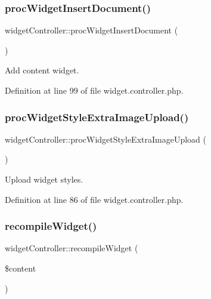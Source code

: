 \subsubsection{\texorpdfstring{proc\+Widget\+Insert\+Document()}{procWidgetInsertDocument()}}
{\footnotesize\ttfamily widget\+Controller\+::proc\+Widget\+Insert\+Document (\begin{DoxyParamCaption}{ }\end{DoxyParamCaption})}



Add content widget. 



Definition at line 99 of file widget.\+controller.\+php.

\hypertarget{classwidgetController_a0abe619fbf8376e7829ade6996c3f707}{}\label{classwidgetController_a0abe619fbf8376e7829ade6996c3f707} 
\subsubsection{\texorpdfstring{proc\+Widget\+Style\+Extra\+Image\+Upload()}{procWidgetStyleExtraImageUpload()}}
{\footnotesize\ttfamily widget\+Controller\+::proc\+Widget\+Style\+Extra\+Image\+Upload (\begin{DoxyParamCaption}{ }\end{DoxyParamCaption})}



Upload widget styles. 



Definition at line 86 of file widget.\+controller.\+php.

\hypertarget{classwidgetController_a0f43ca1a0a8bff6d4fe8d8aca50d65e1}{}\label{classwidgetController_a0f43ca1a0a8bff6d4fe8d8aca50d65e1} 
\subsubsection{\texorpdfstring{recompile\+Widget()}{recompileWidget()}}
{\footnotesize\ttfamily widget\+Controller\+::recompile\+Widget (\begin{DoxyParamCaption}\item[{}]{\$content }\end{DoxyParamCaption})}



